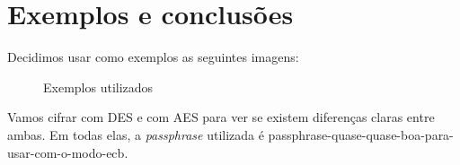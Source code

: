 \section{Exemplos e conclusões}
Decidimos usar como exemplos as seguintes imagens:
\begin{figure}[htb]
\centering
{}
\caption{Exemplos utilizados}
\end{figure}
Vamos cifrar com DES e com AES para ver se existem diferenças claras entre ambas. Em todas elas, a \textit{passphrase} utilizada é \textsf{passphrase-quase-quase-boa-para-usar-com-o-modo-ecb}.\\
